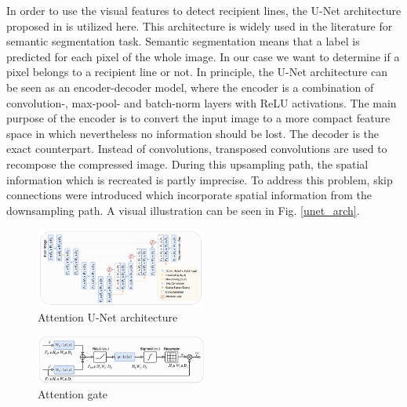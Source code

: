 \documentclass[conference]{IEEEtran}
\begin{document}
In order to use the visual features to detect recipient lines, the U-Net architecture proposed in \cite{ronneberger2015unet} is utilized here. This architecture is widely used in the literature for semantic segmentation task. Semantic segmentation means that a label is predicted for each pixel of the whole image. In our case we want to determine if a pixel belongs to a recipient line or not. In principle, the U-Net architecture can be seen as an encoder-decoder model, where the encoder is a combination of convolution-, max-pool- and batch-norm layers with ReLU activations. The main purpose of the encoder is to convert the input image to a more compact feature space in which nevertheless no information should be lost. The decoder is the exact counterpart. Instead of convolutions, transposed convolutions are used to recompose the compressed image. During this upsampling path, the spatial information which is recreated is partly imprecise. To address this problem, skip connections were introduced which incorporate spatial information from the downsampling path. A visual illustration can be seen in Fig. \ref{unet_arch}. \newline

\begin{figure}[htbp]
    \centering
    \includegraphics[width=0.5\textwidth]{figures/attention_unet_architecture.png}
    \caption{Attention U-Net architecture \cite{oktay2018attention}}
    \label{att_unet_arch}
\end{figure}

\begin{figure}[htbp]
    \centering
    \includegraphics[width=0.5\textwidth]{figures/attention_gate.png}
    \caption{Attention gate \cite{oktay2018attention}}
    \label{att_gate}
\end{figure}
\end{document}
